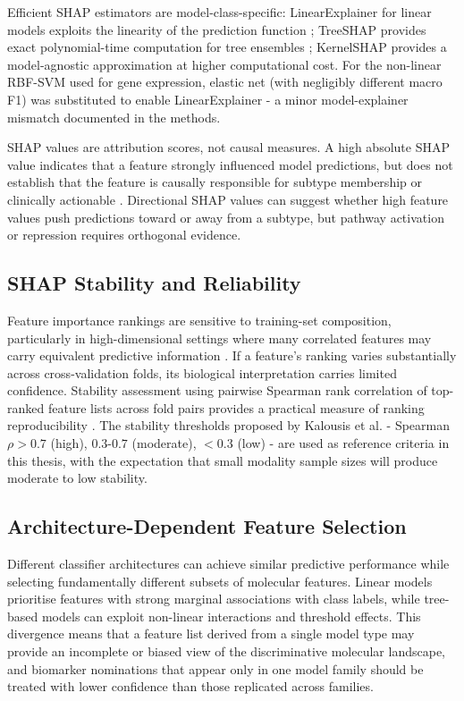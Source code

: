 Efficient SHAP estimators are model-class-specific: LinearExplainer for linear models exploits the linearity of the prediction function \parencite{Lundberg2017}; TreeSHAP provides exact polynomial-time computation for tree ensembles \parencite{Lundberg2020}; KernelSHAP provides a model-agnostic approximation at higher computational cost. For the non-linear RBF-SVM used for gene expression, elastic net (with negligibly different macro F1) was substituted to enable LinearExplainer - a minor model-explainer mismatch documented in the methods.
 
SHAP values are attribution scores, not causal measures. A high absolute SHAP value indicates that a feature strongly influenced model predictions, but does not establish that the feature is causally responsible for subtype membership or clinically actionable \parencite{Lundberg2017}. Directional SHAP values can suggest whether high feature values push predictions toward or away from a subtype, but pathway activation or repression requires orthogonal evidence.
 
\subsection{SHAP Stability and Reliability}
 
Feature importance rankings are sensitive to training-set composition, particularly in high-dimensional settings where many correlated features may carry equivalent predictive information \parencite{Kalousis2007}. If a feature's ranking varies substantially across cross-validation folds, its biological interpretation carries limited confidence. Stability assessment using pairwise Spearman rank correlation of top-ranked feature lists across fold pairs provides a practical measure of ranking reproducibility \parencite{Kalousis2007}. The stability thresholds proposed by Kalousis et al. - Spearman $\rho > 0.7$ (high), $0.3$-$0.7$ (moderate), $< 0.3$ (low) - are used as reference criteria in this thesis, with the expectation that small modality sample sizes will produce moderate to low stability.
 
\subsection{Architecture-Dependent Feature Selection}
 
Different classifier architectures can achieve similar predictive performance while selecting fundamentally different subsets of molecular features. Linear models prioritise features with strong marginal associations with class labels, while tree-based models can exploit non-linear interactions and threshold effects. This divergence means that a feature list derived from a single model type may provide an incomplete or biased view of the discriminative molecular landscape, and biomarker nominations that appear only in one model family should be treated with lower confidence than those replicated across families.
 
